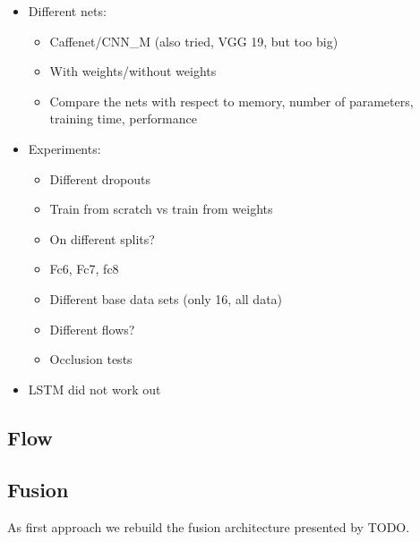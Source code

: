 \begin{itemize}
	\item
		Different nets:
		\begin{itemize}
			\item Caffenet/CNN\_M (also tried, VGG 19, but too big)
			\item With weights/without weights
			\item Compare the nets with respect to memory, number of parameters, training time, performance
		\end{itemize}
	\item
		Experiments:
		\begin{itemize}
			\item Different dropouts
			\item Train from scratch vs train from weights
			\item On different splits?
			\item Fc6, Fc7, fc8
			\item Different base data sets (only 16, all data)
			\item Different flows?
			\item Occlusion tests
		\end{itemize}
	\item
		LSTM did not work out
\end{itemize}


\subsection{Flow}
\label{subsec:flow}



\subsection{Fusion}
\label{subsec:fusion}
As first approach we rebuild the fusion architecture presented by TODO.

